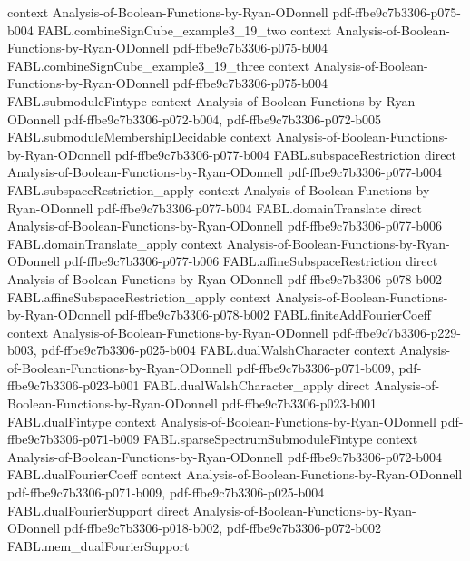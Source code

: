 \begin{theorem}
  {context}
  {Analysis-of-Boolean-Functions-by-Ryan-ODonnell}
  {pdf-ffbe9c7b3306-p075-b004}
\proofstep
  {FABL.combineSignCube_example3_19_two}
  {context}
  {Analysis-of-Boolean-Functions-by-Ryan-ODonnell}
  {pdf-ffbe9c7b3306-p075-b004}
\proofstep
  {FABL.combineSignCube_example3_19_three}
  {context}
  {Analysis-of-Boolean-Functions-by-Ryan-ODonnell}
  {pdf-ffbe9c7b3306-p075-b004}
\proofstep
  {FABL.submoduleFintype}
  {context}
  {Analysis-of-Boolean-Functions-by-Ryan-ODonnell}
  {pdf-ffbe9c7b3306-p072-b004,
    pdf-ffbe9c7b3306-p072-b005}
\proofstep
  {FABL.submoduleMembershipDecidable}
  {context}
  {Analysis-of-Boolean-Functions-by-Ryan-ODonnell}
  {pdf-ffbe9c7b3306-p077-b004}
\proofstep
  {FABL.subspaceRestriction}
  {direct}
  {Analysis-of-Boolean-Functions-by-Ryan-ODonnell}
  {pdf-ffbe9c7b3306-p077-b004}
\proofstep
  {FABL.subspaceRestriction_apply}
  {context}
  {Analysis-of-Boolean-Functions-by-Ryan-ODonnell}
  {pdf-ffbe9c7b3306-p077-b004}
\proofstep
  {FABL.domainTranslate}
  {direct}
  {Analysis-of-Boolean-Functions-by-Ryan-ODonnell}
  {pdf-ffbe9c7b3306-p077-b006}
\proofstep
  {FABL.domainTranslate_apply}
  {context}
  {Analysis-of-Boolean-Functions-by-Ryan-ODonnell}
  {pdf-ffbe9c7b3306-p077-b006}
\proofstep
  {FABL.affineSubspaceRestriction}
  {direct}
  {Analysis-of-Boolean-Functions-by-Ryan-ODonnell}
  {pdf-ffbe9c7b3306-p078-b002}
\proofstep
  {FABL.affineSubspaceRestriction_apply}
  {context}
  {Analysis-of-Boolean-Functions-by-Ryan-ODonnell}
  {pdf-ffbe9c7b3306-p078-b002}
\proofstep
  {FABL.finiteAddFourierCoeff}
  {context}
  {Analysis-of-Boolean-Functions-by-Ryan-ODonnell}
  {pdf-ffbe9c7b3306-p229-b003,
    pdf-ffbe9c7b3306-p025-b004}
\proofstep
  {FABL.dualWalshCharacter}
  {context}
  {Analysis-of-Boolean-Functions-by-Ryan-ODonnell}
  {pdf-ffbe9c7b3306-p071-b009,
    pdf-ffbe9c7b3306-p023-b001}
\proofstep
  {FABL.dualWalshCharacter_apply}
  {direct}
  {Analysis-of-Boolean-Functions-by-Ryan-ODonnell}
  {pdf-ffbe9c7b3306-p023-b001}
\proofstep
  {FABL.dualFintype}
  {context}
  {Analysis-of-Boolean-Functions-by-Ryan-ODonnell}
  {pdf-ffbe9c7b3306-p071-b009}
\proofstep
  {FABL.sparseSpectrumSubmoduleFintype}
  {context}
  {Analysis-of-Boolean-Functions-by-Ryan-ODonnell}
  {pdf-ffbe9c7b3306-p072-b004}
\proofstep
  {FABL.dualFourierCoeff}
  {context}
  {Analysis-of-Boolean-Functions-by-Ryan-ODonnell}
  {pdf-ffbe9c7b3306-p071-b009,
    pdf-ffbe9c7b3306-p025-b004}
\proofstep
  {FABL.dualFourierSupport}
  {direct}
  {Analysis-of-Boolean-Functions-by-Ryan-ODonnell}
  {pdf-ffbe9c7b3306-p018-b002,
    pdf-ffbe9c7b3306-p072-b002}
\proofstep
  {FABL.mem_dualFourierSupport}

\end{theorem}
